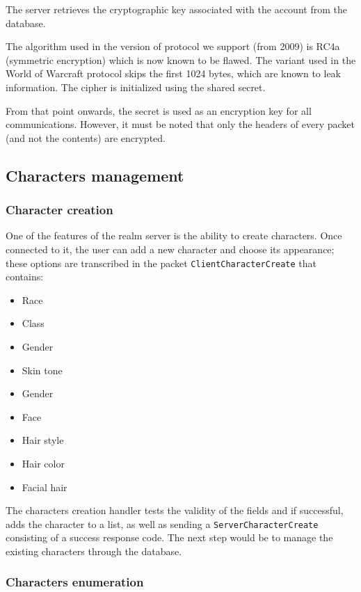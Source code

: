 \documentclass[paper=a4, fontsize=11pt]{scrartcl}
\begin{document}
The server retrieves the cryptographic key associated with the account from the
database.

The algorithm used in the version of protocol we support (from
2009) is RC4a (symmetric encryption) which is now known to be flawed.
The variant used in the World of Warcraft protocol skips the first 1024 bytes,
which are known to leak information.
The cipher is initialized using the shared secret.

From that point onwards, the secret is used as an encryption key for all
communications.
However, it must be noted that only the headers of every packet
(and not the contents) are encrypted.

\subsection{Characters management}

\subsubsection{Character creation}

One of the features of the realm server is the ability to create characters.
Once connected to it, the user can add a new character and choose its appearance; 
these options are transcribed in the packet \texttt{ClientCharacterCreate} that
contains:
\begin{multicols}{2}
\begin{itemize}
    \item Race
    \item Class
    \item Gender
    \item Skin tone
    \item Gender
    \item Face
    \item Hair style
    \item Hair color
    \item Facial hair
\end{itemize}
\end{multicols}

The characters creation handler tests the validity of the fields and if successful,
adds the character to a list, as well as sending a \texttt{ServerCharacterCreate}
consisting of a success response code. The next step would be to manage the existing
characters through the database. 

\subsubsection{Characters enumeration}
\end{document}
